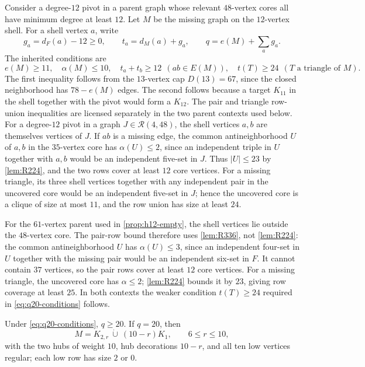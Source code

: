 Consider a degree-$12$ pivot in a parent graph whose relevant $48$-vertex cores all have minimum degree at least $12$. Let $M$ be the missing graph on the $12$-vertex shell. For a shell vertex $a$, write
\[
g_a=d_F(a)-12\geq0,\qquad t_a=d_M(a)+g_a,
\qquad q=e(M)+\sum_a g_a.
\]
The inherited conditions are
\begin{equation}
e(M)\geq11,\quad \alpha(M)\leq10,\quad
t_a+t_b\geq12\ \ (ab\in E(M)),\quad
t(T)\geq24\ \ (T\text{ a triangle of }M).
\label{eq:q20-conditions}
\end{equation}
The first inequality follows from the $13$-vertex cap $D(13)=67$, since the closed neighborhood has $78-e(M)$ edges. The second follows because a target $K_{11}$ in the shell together with the pivot would form a $K_{12}$. The pair and triangle row-union inequalities are licensed separately in the two parent contexts used below. For a degree-$12$ pivot in a graph $J\in\mathcal R(4,48)$, the shell vertices $a,b$ are themselves vertices of $J$. If $ab$ is a missing edge, the common antineighborhood $U$ of $a,b$ in the $35$-vertex core has $\alpha(U)\leq2$, since an independent triple in $U$ together with $a,b$ would be an independent five-set in $J$. Thus $|U|\leq23$ by \cref{lem:R224}, and the two rows cover at least $12$ core vertices. For a missing triangle, its three shell vertices together with any independent pair in the uncovered core would be an independent five-set in $J$; hence the uncovered core is a clique of size at most $11$, and the row union has size at least $24$.

For the $61$-vertex parent used in \cref{prop:h12-empty}, the shell vertices lie outside the $48$-vertex core. The pair-row bound therefore uses \cref{lem:R336}, not \cref{lem:R224}: the common antineighborhood $U$ has $\alpha(U)\leq3$, since an independent four-set in $U$ together with the missing pair would be an independent six-set in $F$. It cannot contain $37$ vertices, so the pair rows cover at least $12$ core vertices. For a missing triangle, the uncovered core has $\alpha\leq2$; \cref{lem:R224} bounds it by $23$, giving row coverage at least $25$. In both contexts the weaker condition $t(T)\geq24$ required in \eqref{eq:q20-conditions} follows.
\begin{lemma}
\label{lem:q20}
Under \eqref{eq:q20-conditions}, $q\geq20$. If $q=20$, then
\[
M=K_{2,r}\ \dot\cup\ (10-r)K_1,\qquad 6\leq r\leq10,
\]
with the two hubs of weight $10$, hub decorations $10-r$, and all ten low vertices regular; each low row has size $2$ or $0$.
\end{lemma}

